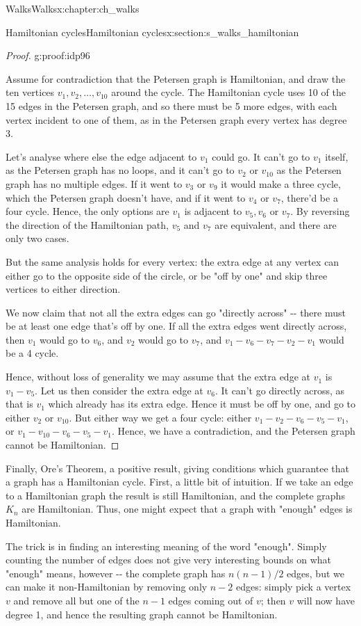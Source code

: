 \documentclass[oneside,10pt,]{book}
\numberwithin{equation}{section}
\begin{document}
\begin{chapterptx}{Walks}{}{Walks}{}{}{x:chapter:ch_walks}
\begin{sectionptx}{Hamiltonian cycles}{}{Hamiltonian cycles}{}{}{x:section:s_walks_hamiltonian}
\begin{proof}{}{g:proof:idp96}
\par
Assume for contradiction that the Petersen graph is Hamiltonian, and draw the ten vertices \(v_1,v_2,\dots,v_{10}\) around the cycle.  The Hamiltonian cycle uses 10 of the 15 edges in the Petersen graph, and so there must be 5 more edges, with each vertex incident to one of them, as in the Petersen graph every vertex has degree 3.%
\par
Let's analyse where else the edge adjacent to \(v_1\) could go.  It can't go to \(v_1\) itself, as the Petersen graph has no loops, and it can't go to \(v_2\) or \(v_{10}\) as the Petersen graph has no multiple edges.  If it went to \(v_3\) or \(v_9\) it would make a three cycle, which the Petersen graph doesn't have, and if it went to \(v_4\) or \(v_7\), there'd be a four cycle.  Hence, the only options are \(v_1\) is adjacent to \(v_5, v_6\) or \(v_7\).  By reversing the direction of the Hamiltonian path, \(v_5\) and \(v_7\) are equivalent, and there are only two cases.%
\par
But the same analysis holds for every vertex: the extra edge at any vertex can either go to the opposite side of the circle, or be "off by one" and skip three vertices to either direction.%
\par
We now claim that not all the extra edges can go "directly across" -{}-{} there must be at least one edge that's off by one.  If all the extra edges went directly across, then \(v_1\) would go to \(v_6\), and \(v_2\) would go to \(v_7\), and \(v_1-v_6-v_7-v_2-v_1\) would be a 4 cycle.%
\par
Hence, without loss of generality we may assume that the extra edge at \(v_1\) is \(v_1-v_5\).  Let us then consider the extra edge at \(v_6\).  It can't go directly across, as that is \(v_1\) which already has its extra edge.  Hence it must be off by one, and go to either \(v_2\) or \(v_{10}\).  But either way we get a four cycle: either \(v_1-v_2-v_6-v_5-v_1\), or \(v_1-v_{10}-v_6-v_5-v_1\).  Hence, we have a contradiction, and the Petersen graph cannot be Hamiltonian.%
\end{proof}
Finally, Ore's Theorem, a positive result, giving conditions which guarantee that a graph has a Hamiltonian cycle.  First, a little bit of intuition.  If we take an edge to a Hamiltonian graph the result is still Hamiltonian, and the complete graphs \(K_n\) are Hamiltonian.  Thus, one might expect that a graph with "enough" edges is Hamiltonian.%
\par
The trick is in finding an interesting meaning of the word "enough".  Simply counting the number of edges does not give very interesting bounds on what "enough" means, however -{}-{} the complete graph has \(n(n-1)/2\) edges, but we can make it non-Hamiltonian by removing only \(n-2\) edges: simply pick a vertex \(v\) and remove all but one of the \(n-1\) edges coming out of \(v\); then \(v\) will now have degree 1, and hence the resulting graph cannot be Hamiltonian.%

\end{sectionptx}
\end{chapterptx}
\end{document}
